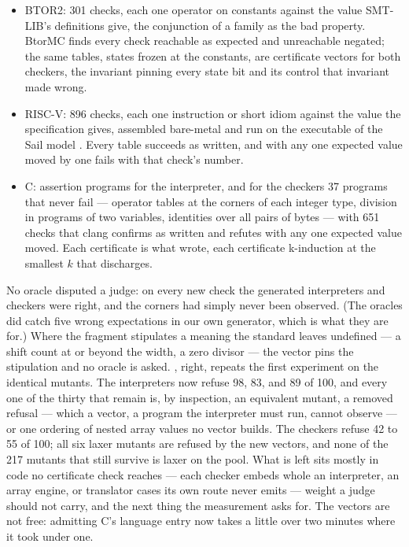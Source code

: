 \begin{itemize}
\item BTOR2: 301 checks, each one operator on constants against the
  value SMT-LIB's definitions give, the conjunction of a family as
  the bad property. BtorMC \citep{niemetz2018btor2} finds every check
  reachable as expected and unreachable negated; the same tables,
  states frozen at the constants, are certificate vectors for both
  checkers, the invariant pinning every state bit and its control
  that invariant made wrong.
\item RISC-V: 896 checks, each one instruction or short idiom
  against the value the specification gives, assembled bare-metal and
  run on the executable of the Sail model
  \citep{armstrong2019sail}. Every table succeeds as written, and
  with any one expected value moved by one fails with that check's
  number.
\item C: assertion programs for the interpreter, and for the checkers
  37 programs that never fail --- operator tables at the corners of
  each integer type, division in programs of two variables,
  identities over all pairs of bytes --- with 651 checks that clang
  confirms as written and refutes with any one expected value moved.
  Each  certificate is what  wrote, each
   certificate k-induction at the smallest $k$ that
  discharges.
\end{itemize}

No oracle disputed a judge: on every new check the generated
interpreters and checkers were right, and the corners had simply
never been observed. (The oracles did catch five wrong expectations
in our own generator, which is what they are for.) Where the fragment
stipulates a meaning the standard leaves undefined --- a shift count
at or beyond the width, a zero divisor --- the vector pins the
stipulation and no oracle is asked. , right, repeats
the first experiment on the identical mutants. The interpreters now
refuse 98, 83, and 89 of 100, and every one of the thirty that remain
is, by inspection, an equivalent mutant, a removed refusal --- which a vector, a
program the interpreter must run, cannot observe --- or one ordering
of nested array values no vector builds. The checkers refuse 42 to 55
of 100; all six laxer mutants are refused by the new vectors, and
none of the 217 mutants that still survive is laxer on the pool. What
is left sits mostly in code no certificate check reaches --- each
checker embeds whole an interpreter, an array engine, or translator
cases its own route never emits --- weight a judge should not carry,
and the next thing the measurement asks for. The vectors are not free:
admitting C's language entry now takes a little over two minutes
where it took under one.


